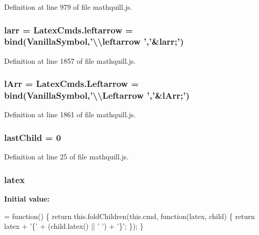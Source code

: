 Definition at line 979 of file mathquill.\-js.

\subsubsection[{larr}]{ larr = Latex\-Cmds.\-leftarrow = {\bf bind}({\bf Vanilla\-Symbol},'\textbackslash{}\textbackslash{}leftarrow ','\&larr;')}\label{mathquill_8js_ab20de417884c94b91962aecbd677a470}


Definition at line 1857 of file mathquill.\-js.

\subsubsection[{l\-Arr}]{ l\-Arr = Latex\-Cmds.\-Leftarrow = {\bf bind}({\bf Vanilla\-Symbol},'\textbackslash{}\textbackslash{}Leftarrow ','\&l\-Arr;')}\label{mathquill_8js_af551f69d02833cb1de3d9699e09687f4}


Definition at line 1861 of file mathquill.\-js.

\subsubsection[{last\-Child}]{\setlength{\rightskip}{0pt plus 5cm}{\bf \-\_\-} last\-Child = 0}\label{mathquill_8js_a5b58eddc70f00d8c432370e262d40f9f}


Definition at line 25 of file mathquill.\-js.

\subsubsection[{latex}]{\setlength{\rightskip}{0pt plus 5cm}{\bf \-\_\-} latex}\label{mathquill_8js_a56c264668251f5dd188d00f008e27c04}
{\bfseries Initial value\-:}
\begin{DoxyCode}
= \textcolor{keyword}{function}() \{
  \textcolor{keywordflow}{return} this.foldChildren(this.cmd, \textcolor{keyword}{function}(latex, child) \{
    \textcolor{keywordflow}{return} latex + \textcolor{charliteral}{'\{'} + (child.latex() || \textcolor{charliteral}{' '}) + \textcolor{charliteral}{'\}'};
  \});
\}
\end{DoxyCode}


